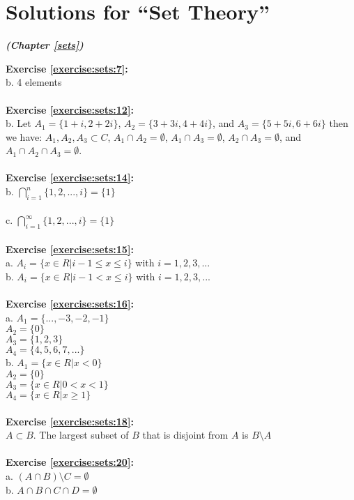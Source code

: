 \section{Solutions for ``Set Theory''}
\noindent\textbf{\textit{ (Chapter \ref{sets})}}\bigskip

\textbf{Exercise \ref{exercise:sets:7}:}\\
b. 4 elements\\
\\
\textbf{Exercise \ref{exercise:sets:12}:}\\
b. Let $A_1=\{ 1+i,2+2i\}$, $A_2=\{ 3+3i,4+4i\}$, and $A_3=\{5+5i,6+6i\}$ then we have:
$A_1,A_2,A_3 \subset C$, $A_1 \cap A_2=\emptyset$, $A_1 \cap A_3=\emptyset$, $A_2 \cap A_3=\emptyset$, and $A_1 \cap A_2 \cap A_3=\emptyset$.\\
\\
\textbf{Exercise \ref{exercise:sets:14}:}\\
b. $\bigcap^{n}_{i=1} \{ 1,2,...,i \}=\{1\}$\\
\\
c. $\bigcap^{\infty}_{i=1} \{ 1,2,...,i \}=\{1\}$\\
\\
\textbf{Exercise \ref{exercise:sets:15}:}\\
a. $A_i=\{x\in R|i-1 \le x\le i\}$ with $i=1,2,3,...$\\
b. $A_i=\{x\in R|i-1 < x\le i\}$ with $i=1,2,3,...$\\
\\
\textbf{Exercise \ref{exercise:sets:16}:}\\
a. $A_1=\{...,-3,-2,-1\} $\\
$A_2=\{0\}$\\
$A_3=\{1,2,3\}$\\
$A_4=\{4,5,6,7,...\}$\\
b. $A_1=\{x\in R|x<0\}$\\
$A_2=\{0\}$\\
$A_3=\{x\in R|0<x<1\}$\\
$A_4=\{x\in R|x\ge 1\}$\\
\\
\textbf{Exercise \ref{exercise:sets:18}:}\\
$A\subset B$. The largest subset of $B$ that is disjoint from $A$ is $B\setminus A$\\
\\
\textbf{Exercise \ref{exercise:sets:20}:}\\
a. $(A\cap B)\setminus C=\emptyset$\\
b. $A\cap B\cap C\cap D=\emptyset$\\
